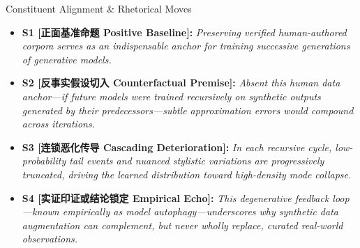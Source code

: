 \begin{TipBox}{Constituent Alignment \& Rhetorical Moves}
\begin{itemize}[leftmargin=1.5em]
  \item \textbf{S1 [正面基准命题 Positive Baseline]:} \textit{Preserving verified human-authored corpora serves as an indispensable anchor for training successive generations of generative models.}\par{}
  \item \textbf{S2 [反事实假设切入 Counterfactual Premise]:} \textit{Absent this human data anchor---if future models were trained recursively on synthetic outputs generated by their predecessors---subtle approximation errors would compound across iterations.}\par{}
  \item \textbf{S3 [连锁恶化传导 Cascading Deterioration]:} \textit{In each recursive cycle, low-probability tail events and nuanced stylistic variations are progressively truncated, driving the learned distribution toward high-density mode collapse.}\par{}
  \item \textbf{S4 [实证印证或结论锁定 Empirical Echo]:} \textit{This degenerative feedback loop---known empirically as model autophagy---underscores why synthetic data augmentation can complement, but never wholly replace, curated real-world observations.}\par{}
\end{itemize}
\end{TipBox}
\bigskip
